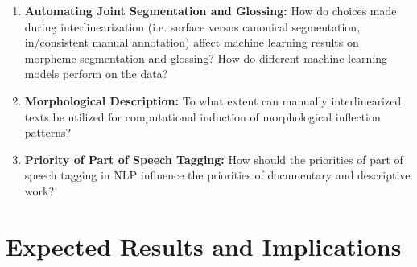 \begin{enumerate}
\item{} \textbf{Automating Joint Segmentation and Glossing:} How do choices made during interlinearization (i.e. surface versus canonical segmentation, in/consistent manual annotation) affect machine learning results on morpheme segmentation and glossing? How do different machine learning models perform on the data?


\item{} \textbf{Morphological Description:} To what extent can manually interlinearized texts be utilized for computational induction of morphological inflection patterns?

\item \textbf{Priority of Part of Speech Tagging:} How should the priorities of part of speech tagging in NLP influence the priorities of documentary and descriptive work?

\end{enumerate}

\section{Expected Results and Implications}

